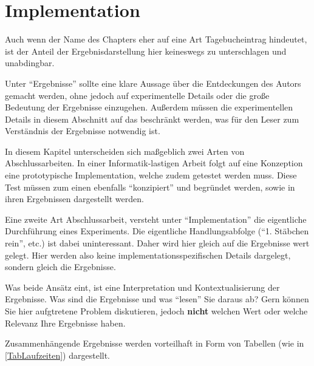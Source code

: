 

\clearpage
\chapter{Implementation}

Auch wenn der Name des Chapters eher auf eine Art Tagebucheintrag hindeutet, ist der Anteil der Ergebnisdarstellung hier keineswegs zu unterschlagen und unabdingbar.

Unter \enquote{Ergebnisse} sollte eine klare Aussage über die Entdeckungen des Autors gemacht werden, ohne jedoch auf experimentelle Details oder die große Bedeutung der Ergebnisse einzugehen. 
Außerdem müssen die experimentellen Details in diesem Abschnitt auf das beschränkt werden, was für den Leser zum Verständnis der Ergebnisse notwendig ist.

In diesem Kapitel unterscheiden sich maßgeblich zwei Arten von Abschlussarbeiten. In einer Informatik-lastigen Arbeit folgt auf eine Konzeption eine prototypische Implementation,
welche zudem getestet werden muss. Diese Test müssen zum einen ebenfalls \enquote{konzipiert} und begründet werden, sowie in ihren Ergebnissen dargestellt werden.

Eine zweite Art Abschlussarbeit, versteht unter \enquote{Implementation} die eigentliche Durchführung eines Experiments. Die eigentliche Handlungsabfolge (\enquote{1. Stäbchen rein}, etc.) ist dabei 
uninteressant. Daher wird hier gleich auf die Ergebnisse wert gelegt. Hier werden also keine implementationsspezifischen Details dargelegt, sondern gleich die Ergebnisse.

Was beide Ansätz eint, ist eine Interpretation und Kontextualisierung der Ergebnisse. Was sind die Ergebnisse und was \enquote{lesen} Sie daraus ab?
Gern können Sie hier aufgtretene Problem diskutieren, jedoch \textbf{nicht} welchen Wert oder welche Relevanz Ihre Ergebnisse haben.\\


\newpage

Zusammenhängende Ergebnisse werden vorteilhaft in Form von Tabellen (wie in \ref{TabLaufzeiten}) dargestellt.

